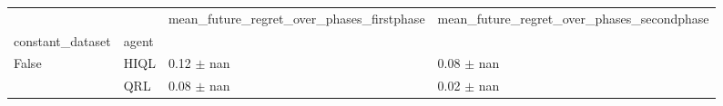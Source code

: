 \begin{tabular}{llll}
\toprule
 &  & mean_future_regret_over_phases_firstphase & mean_future_regret_over_phases_secondphase \\
constant_dataset & agent &  &  \\
\midrule
\multirow[t]{2}{*}{False} & HIQL & 0.12 $\pm$ nan & 0.08 $\pm$ nan \\
 & QRL & 0.08 $\pm$ nan & 0.02 $\pm$ nan \\
\cline{1-4}
\bottomrule
\end{tabular}
